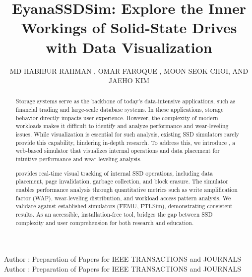 \documentclass{ieeeaccess}
\begin{document}

\title{EyanaSSDSim: Explore the Inner Workings of Solid-State Drives with Data Visualization}


\author{\uppercase{Md Habibur Rahman} ,
\uppercase{Omar Faroque , MOON SEOK CHOI, and Jaeho Kim}}
\address[1]{Dept. AI Convergence Engineering, Gyeongsang National University, Jinju, South Korea (e-mail: habib@gnu.ac.kr)}
\address[2]{Dept. Computer Science, The University of Texas at Austin, Texas, USA (e-mail: faroque.ae@gmail.com)}
\address[3]{Dept. AI Convergence Engineering, Gyeongsang National University, Jinju, South Korea (e-mail:ch011015@gnu.ac.kr)}
\address[4]{Dept. AI Convergence Engineering, Gyeongsang National University, Jinju, South Korea (e-mail: jaeho.kim@gnu.ac.kr)}

\markboth
{Author \headeretal: Preparation of Papers for IEEE TRANSACTIONS and JOURNALS}
{Author \headeretal: Preparation of Papers for IEEE TRANSACTIONS and JOURNALS}

\begin{abstract}
Storage systems serve as the backbone of today's data-intensive applications, such as financial trading and large-scale database systems. In these applications, storage behavior directly impacts user experience. However, the complexity of modern workloads makes it difficult to identify and analyze performance and wear-leveling issues. While visualization is essential for such analysis, existing SSD simulators rarely provide this capability, hindering in-depth research.
To address this, we introduce \eyanassdsim, a web-based simulator that visualizes internal operations and data placement for intuitive performance and wear-leveling analysis.

\eyanassdsim provides real-time visual tracking of internal SSD operations, including data placement, page invalidation, garbage collection, and block erasure. The simulator enables performance analysis through quantitative metrics such as write amplification factor (WAF), wear-leveling distribution, and workload access pattern analysis. We validate \eyanassdsim against established simulators (FEMU, FTLSim), demonstrating consistent results. As an accessible, installation-free tool, \eyanassdsim bridges the gap between SSD complexity and user comprehension for both research and education.

\end{abstract}
\end{document}

